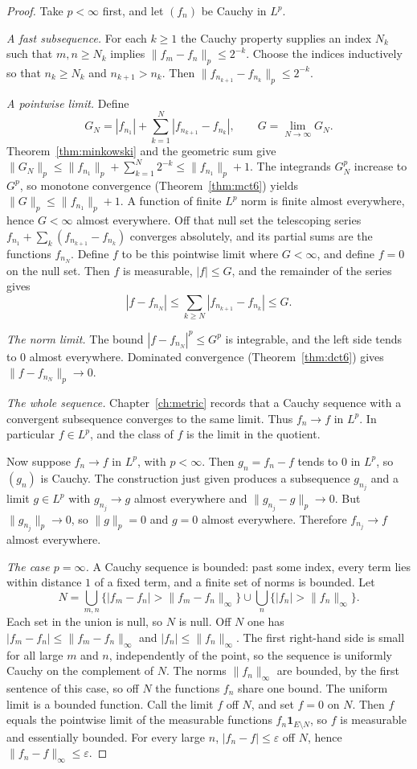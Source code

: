 \begin{proof}
Take $p<\infty$ first, and let $(f_n)$ be Cauchy in $L^p$.

\emph{A fast subsequence.} For each $k\ge1$ the Cauchy property supplies an index $N_k$ such that $m,n\ge N_k$ implies $\|f_m-f_n\|_p\le2^{-k}$. Choose the indices inductively so that $n_k\ge N_k$ and $n_{k+1}>n_k$. Then $\|f_{n_{k+1}}-f_{n_k}\|_p\le2^{-k}$.

\emph{A pointwise limit.} Define
\[G_N=|f_{n_1}|+\sum_{k=1}^N|f_{n_{k+1}}-f_{n_k}|,\qquad G=\lim_{N\to\infty}G_N.\]
Theorem~\ref{thm:minkowski} and the geometric sum give $\|G_N\|_p\le\|f_{n_1}\|_p+\sum_{k=1}^N2^{-k}\le\|f_{n_1}\|_p+1$. The integrands $G_N^p$ increase to $G^p$, so monotone convergence (Theorem~\ref{thm:mct6}) yields $\|G\|_p\le\|f_{n_1}\|_p+1$. A function of finite $L^p$ norm is finite almost everywhere, hence $G<\infty$ almost everywhere. Off that null set the telescoping series $f_{n_1}+\sum_k(f_{n_{k+1}}-f_{n_k})$ converges absolutely, and its partial sums are the functions $f_{n_N}$. Define $f$ to be this pointwise limit where $G<\infty$, and define $f=0$ on the null set. Then $f$ is measurable, $|f|\le G$, and the remainder of the series gives
\[|f-f_{n_N}|\le\sum_{k\ge N}|f_{n_{k+1}}-f_{n_k}|\le G.\]

\emph{The norm limit.} The bound $|f-f_{n_N}|^p\le G^p$ is integrable, and the left side tends to $0$ almost everywhere. Dominated convergence (Theorem~\ref{thm:dct6}) gives $\|f-f_{n_N}\|_p\to0$.

\emph{The whole sequence.} Chapter~\ref{ch:metric} records that a Cauchy sequence with a convergent subsequence converges to the same limit. Thus $f_n\to f$ in $L^p$. In particular $f\in L^p$, and the class of $f$ is the limit in the quotient.

Now suppose $f_n\to f$ in $L^p$, with $p<\infty$. Then $g_n=f_n-f$ tends to $0$ in $L^p$, so $(g_n)$ is Cauchy. The construction just given produces a subsequence $g_{n_j}$ and a limit $g\in L^p$ with $g_{n_j}\to g$ almost everywhere and $\|g_{n_j}-g\|_p\to0$. But $\|g_{n_j}\|_p\to0$, so $\|g\|_p=0$ and $g=0$ almost everywhere. Therefore $f_{n_j}\to f$ almost everywhere.

\emph{The case $p=\infty$.} A Cauchy sequence is bounded: past some index, every term lies within distance $1$ of a fixed term, and a finite set of norms is bounded. Let
\[N=\bigcup_{m,n}\bigl\{|f_m-f_n|>\|f_m-f_n\|_\infty\bigr\}\cup\bigcup_n\bigl\{|f_n|>\|f_n\|_\infty\bigr\}.\]
Each set in the union is null, so $N$ is null. Off $N$ one has $|f_m-f_n|\le\|f_m-f_n\|_\infty$ and $|f_n|\le\|f_n\|_\infty$. The first right-hand side is small for all large $m$ and $n$, independently of the point, so the sequence is uniformly Cauchy on the complement of $N$. The norms $\|f_n\|_\infty$ are bounded, by the first sentence of this case, so off $N$ the functions $f_n$ share one bound. The uniform limit is a bounded function. Call the limit $f$ off $N$, and set $f=0$ on $N$. Then $f$ equals the pointwise limit of the measurable functions $f_n\mathbf 1_{E\setminus N}$, so $f$ is measurable and essentially bounded. For every large $n$, $|f_n-f|\le\varepsilon$ off $N$, hence $\|f_n-f\|_\infty\le\varepsilon$.
\end{proof}

